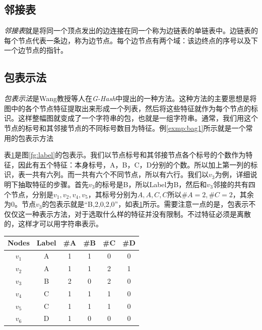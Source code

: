 \documentclass{XDBAthesis}
\begin{document}

\subsection{邻接表}
    \emph{邻接表}\cite{GraphAlgorithm}就是将同一个顶点发出的边连接在同一个称为边链表的单链表中。边链表的每个节点代表一条边，称为边节点。每个边节点有两个域：该边终点的序号以及下一个边节点的指针。
    
\subsection{包表示法}
\emph{包表示法}是Wang教授等人在\emph{G-Hash}\cite{ghash}中提出的一种方法。这种方法的主要思想是将图中的各个节点特征提取出来形成一个列表，然后将这些特征就作为每个节点的标识。这样整幅图就变成了一个字符串的包，也就是一组字符串。通常，我们用这个节点的标号和其邻接节点的不同标号数目为特征。例\ref{exmp:bag1}所示就是一个常用的包表示方法
\begin{exmp}
    表\ref{tb:bagr1}是图\ref{fg:label}的包表示。我们以节点标号和其邻接节点各个标号的个数作为特征，因此有五个特征：本身标号，A，B，C，D分别的个数。所以加上第一列的标识，表一共有六列。而一共有六个不同节点，所以有六行。我们以$v_3 $为例，详细说明下抽取特征的步骤。首先$v_3 $的标号是B，所以Label为B，然后和$v_3$邻接的共有四个节点，分别是$v_1 ,v_2 ,v_4 ,v_5 $，其标号分别为$A,A,C,C$所以$\#A=2,\#C=2$，其余为0。节点$v_3 $的包表示就是“B,2,0,2,0”，如表\ref{tb:bagr1}所示。需要注意一点的是，包表示不仅仅这一种表示方法，对于选取什么样的特征并没有限制。不过特征必须是离散的，这样才可以用字符串表示。
    \label{exmp:bag1}
\end{exmp}


\begin{table}[htb]
    \centering
    \begin{tabular}{c|c|c|c|c|c}
        Nodes & Label & \#A & \#B & \#C & \#D \\ \hline
        $v_1$ & A & 1 & 1 & 0 & 0 \\ \hline
        $v_2$ & A & 1 & 1 & 2 & 1 \\ \hline
        $v_3$ & B & 2 & 0 & 2 & 0 \\ \hline
        $v_4$ & C & 1 & 1 & 1 & 0 \\ \hline
        $v_5$ & C & 1 & 1 & 1 & 0 \\ \hline
        $v_6$ & D & 1 & 0 & 0 & 0 \\ \hline
    \end{tabular}
    \label{tb:bagr1}
\end{table}
    
\end{document}
